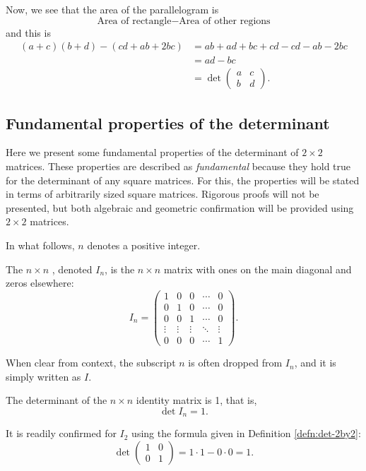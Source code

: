 \documentclass{ximera}
\begin{document}
Now, we see that the area of the parallelogram is
\[
\text{Area of rectangle} - \text{Area of other regions}
\]
and this is
\begin{align*}
  (a+c)(b+d) - \left(cd + ab + 2bc \right)&= ab + ad + bc + cd - cd - ab-2bc\\
  &=  ad - bc\\
  &= \det
  \begin{pmatrix}
    a & c\\
    b & d
  \end{pmatrix}.
\end{align*}

\subsection{Fundamental properties of the determinant}
Here we present some fundamental properties of the determinant of
$2 \times 2$ matrices. These properties are described as
\textit{fundamental} because they hold true for the determinant of any
square matrices. For this, the properties will be stated in terms of
arbitrarily sized square matrices. Rigorous proofs will not be
presented, but both algebraic and geometric confirmation will be
provided using $2 \times 2$ matrices.

In what follows, $n$ denotes a positive integer.

\begin{definition}\label{defn:id}
  The $n \times n$ , denoted $I_n$, is the
  $n \times n$ matrix with ones on the main diagonal and zeros elsewhere:
  \[
    I_n =
    \begin{pmatrix}
      1 & 0 & 0 & \cdots & 0 \\
      0 & 1 & 0 & \cdots & 0 \\
      0 & 0 & 1 & \cdots & 0 \\
      \vdots & \vdots & \vdots & \ddots & \vdots \\
      0 & 0 & 0 & \cdots & 1
    \end{pmatrix}.
  \]
\end{definition}
When clear from context, the subscript $n$ is often dropped from
$I_n$, and it is simply written as $I$.

\begin{proposition}
  The determinant of the $n \times n$ identity matrix is 1, that is,
  \[
    \det I_n = 1.
  \]
\end{proposition}

It is readily confirmed for $I_2$ using the formula given in
Definition \ref{defn:det-2by2}:
\[
  \det
  \begin{pmatrix}
    1 & 0 \\ 0 & 1
  \end{pmatrix}
  = 1 \cdot 1 - 0 \cdot 0 = 1.
\]
\end{document}
